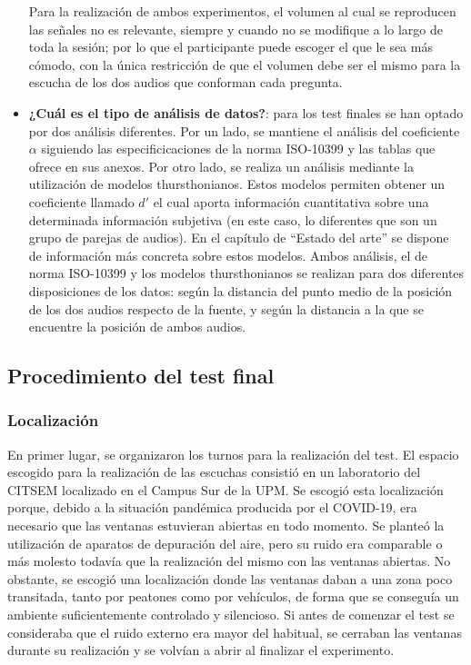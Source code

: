 \documentclass[11pt,a4paper,twoside]{book}
\begin{document}
\begin{itemize}
                    Para la realización de ambos experimentos, el volumen al cual se reproducen las señales no es relevante, siempre y cuando no se modifique a lo largo de toda la sesión; por lo que el participante puede escoger el que le sea más cómodo, con la única restricción de que el volumen debe ser el mismo para la escucha de los dos audios que conforman cada pregunta.
                    \item \textbf{¿Cuál es el tipo de análisis de datos?}: para los test finales se han optado por dos análisis diferentes. Por un lado, se mantiene el análisis del coeficiente $\alpha$ siguiendo las especificicaciones de la norma ISO-10399\cite{ISO10399} y las tablas que ofrece en sus anexos. Por otro lado, se realiza un análisis mediante la utilización de modelos thursthonianos. Estos modelos permiten obtener un coeficiente llamado $d'$ el cual aporta información cuantitativa sobre una determinada información subjetiva (en este caso, lo diferentes que son un grupo de parejas de audios). En el capítulo de ``Estado del arte'' se dispone de información más concreta sobre estos modelos. Ambos análisis, el de norma ISO-10399 y los modelos thursthonianos se realizan para dos diferentes disposiciones de los datos: según la distancia del punto medio de la posición de los dos audios respecto de la fuente, y según la distancia a la que se encuentre la posición de ambos audios.
                     
                \end{itemize}
            \subsection{Procedimiento del test final}
        
                \subsubsection*{Localización}
                    En primer lugar, se organizaron los turnos para la realización del test. El espacio escogido para la realización de las escuchas consistió en un laboratorio del CITSEM localizado en el Campus Sur de la UPM. Se escogió esta localización porque, debido a la situación pandémica producida por el COVID-19, era necesario que las ventanas estuvieran abiertas en todo momento. Se planteó la utilización de aparatos de depuración del aire, pero su ruido era comparable o más molesto todavía que la realización del mismo con las ventanas abiertas. No obstante, se escogió una localización donde las ventanas daban a una zona poco transitada, tanto por peatones como por vehículos, de forma que se conseguía un ambiente suficientemente controlado y silencioso. Si antes de comenzar el test se consideraba que el ruido externo era mayor del habitual, se cerraban las ventanas durante su realización y se volvían a abrir al finalizar el experimento.
            
\end{document}
